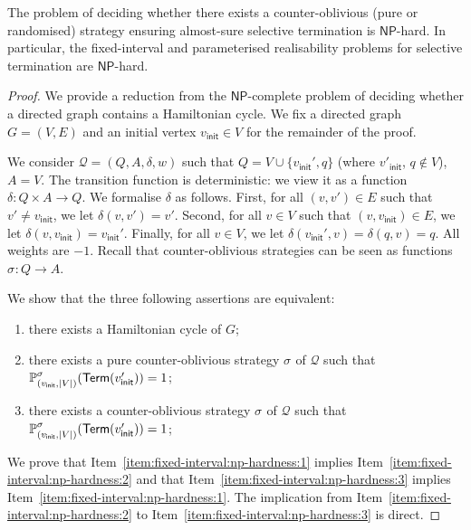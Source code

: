 \documentclass[a4paper,UKenglish,cleveref,autoref,thm-restate,colorlinks]{lipics-v2021}
\newcommand{\init}{\mathsf{init}}
\newcommand{\np}{\textsf{NP}}
\newcommand{\graph}{G}
\newcommand{\vertexSet}{V}
\newcommand{\vertex}{v}
\newcommand{\edgeSet}{E}
\newcommand{\mdpActionSpace}{A}
\newcommand{\weight}{w}
\newcommand{\ocmdp}{\mathcal{Q}}
\newcommand{\ocStateSpace}{Q}
\newcommand{\ocState}{q}
\newcommand{\ocActionSpace}{A}
\newcommand{\ocTrans}{\delta}
\newcommand{\ocTuple}{(\ocStateSpace, \ocActionSpace, \ocTrans, \weight)}
\newcommand{\termination}{\mathsf{Term}}
\newcommand{\selectiveTermination}[1]{\termination({#1})}
\newcommand{\stratGeneric}[1]{{\sigma_{#1}}}
\newcommand{\strat}{\stratGeneric{}}
\begin{document}
\begin{theorem}\label{theorem:realisability:np-hardness}
  The problem of deciding whether there exists a counter-oblivious (pure or randomised) strategy ensuring almost-sure selective termination is $\np$-hard.
  In particular, the fixed-interval and parameterised realisability problems for selective termination are $\np$-hard.
\end{theorem}
\begin{proof}
  We provide a reduction from the $\np$-complete problem of deciding whether a directed graph contains a Hamiltonian cycle.
  We fix a directed graph $\graph=(\vertexSet, \edgeSet)$ and an initial vertex $\vertex_\init\in\vertexSet$ for the remainder of the proof.

  We consider $\ocmdp = \ocTuple$ such that $\ocStateSpace = \vertexSet\cup\{\vertex_\init', \ocState\}$ (where $\vertex'_\init$, $\ocState\notin\vertexSet$), $\mdpActionSpace = \vertexSet$.
  The transition function is deterministic: we view it as a function $\ocTrans\colon\ocStateSpace\times\ocActionSpace\to\ocStateSpace$.
  We formalise $\ocTrans$ as follows.
  First, for all $(\vertex, \vertex')\in\edgeSet$ such that $\vertex'\neq\vertex_\init$, we let $\ocTrans(\vertex, \vertex') = \vertex'$.
  Second, for all $\vertex\in\vertexSet$ such that $(\vertex, \vertex_\init)\in\edgeSet$, we let $\ocTrans(\vertex, \vertex_\init) = \vertex_\init'$.
  Finally, for all $\vertex\in\vertexSet$, we let $\ocTrans(\vertex_\init', \vertex) = \ocTrans(\ocState, \vertex) = \ocState$.
  All weights are $-1$.
  Recall that counter-oblivious strategies can be seen as functions $\strat\colon\ocStateSpace\to\ocActionSpace$.

  We show that the three following assertions are equivalent:
  \begin{enumerate}
  \item there exists a Hamiltonian cycle of $\graph$;\label{item:fixed-interval:np-hardness:1}
  \item there exists a pure counter-oblivious strategy $\strat$ of $\ocmdp$ such that $\probaG{(\vertex_\init, |\vertexSet|)}{\strat}(\selectiveTermination{\vertex_\init'})=1$;\label{item:fixed-interval:np-hardness:2}
  \item there exists a counter-oblivious strategy $\strat$ of $\ocmdp$ such that $\probaG{(\vertex_\init, |\vertexSet|)}{\strat}(\selectiveTermination{\vertex_\init'})=1$;\label{item:fixed-interval:np-hardness:3}
  \end{enumerate}
  We prove that Item~\ref{item:fixed-interval:np-hardness:1} implies Item~\ref{item:fixed-interval:np-hardness:2} and that Item~\ref{item:fixed-interval:np-hardness:3} implies Item~\ref{item:fixed-interval:np-hardness:1}.
  The implication from Item~\ref{item:fixed-interval:np-hardness:2} to Item~\ref{item:fixed-interval:np-hardness:3} is direct.


\end{proof}
\end{document}
